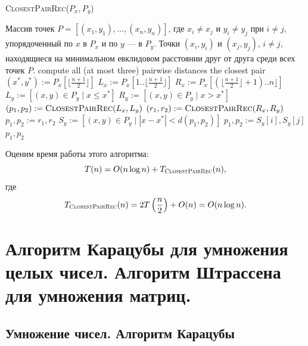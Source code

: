 \documentclass[a4paper,12pt]{article}
\newcommand{\algname}[1]{\textsc{#1}}
\begin{document}
\begin{algorithm}[H]
  	\caption{\algname{ClosestPairRec}($P_x, P_y$)}
	\label{algo:pair-rec}
	\begin{algorithmic}
		\Require Массив точек $P = [(x_1, y_1), \dots, (x_n, y_n)]$, где $x_i \neq x_j$ и $y_i \neq y_j$ при $i \neq j$, упорядоченный по $x$ в $P_x$ и по $y$ --- в $P_y$.
		\Ensure Точки $(x_i, y_i)$ и $(x_j, y_j)$, $i \neq j$, находящиеся на минимальном евклидовом расстоянии друг от друга среди всех точек $P$.
		\State
			\State compute all (at most three) pairwise distances
			\Return the closest pair
		\EndIf
		\State
		\State $(x^*, y^*) := P_x[\lfloor\frac{n+1}{2}\rfloor]$
		\State $L_x := P_x[1..\lfloor\frac{n+1}{2}\rfloor]$
		\State $R_x := P_x[(\lfloor\frac{n+1}{2}\rfloor + 1)..n\rfloor]$
		\State $L_y := [(x, y) \in P_y \mid x \leq x^*]$
		\State $R_y := [(x, y) \in P_y \mid x > x^*]$
		\State
		\State $(p_1, p_2) := \algname{ClosestPairRec}(L_x, L_y)$
		\State $(r_1, r_2) := \algname{ClosestPairRec}(R_x, R_y)$
			\State $p_1, p_2 := r_1, r_2$
		\EndIf
		\State
		\State $S_y := [(x, y) \in P_y \mid |x - x^*| < d(p_1, p_2)]$
		\State
 		   			\State $p_1, p_2 := S_y[i], S_y[j]$
				\EndIf
			\EndFor
		\EndFor
		\State
		\Return $p_1, p_2$
	\end{algorithmic}
\end{algorithm}

Оценим время работы этого алгоритма:
$$T(n) = O(n\log n) + T_{\algname{ClosestPairRec}}(n),$$
где
$$T_{\algname{ClosestPairRec}}(n) = 2 T\left(\frac{n}{2}\right) + O(n) = O(n\log n).$$
\newpage
\section{Алгоритм Карацубы для умножения целых чисел. Алгоритм Штрассена для умножения матриц.}

\subsection{Умножение чисел. Алгоритм Карацубы}
\end{document}
